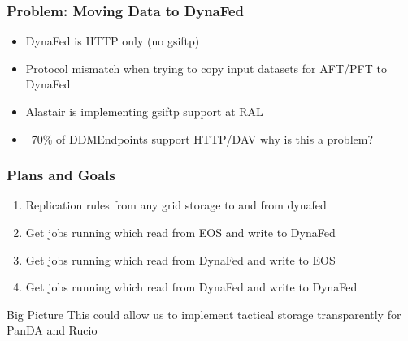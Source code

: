 \documentclass{beamer}
\begin{document}
\begin{frame}
  \frametitle{Problem: Moving Data to DynaFed}
  \begin{itemize}
    \item DynaFed is HTTP only (no gsiftp)
    \item Protocol mismatch when trying to copy input datasets for AFT/PFT to DynaFed
    \item Alastair is implementing gsiftp support at RAL
    \item ~70\% of DDMEndpoints support HTTP/DAV why is this a problem?
  \end{itemize}
\end{frame}

\begin{frame}
  \frametitle{Plans and Goals}
  \begin{enumerate}
    \item Replication rules from any grid storage to and from dynafed
    \item Get jobs running which read from EOS and write to DynaFed
    \item Get jobs running which read from DynaFed and write to EOS
    \item Get jobs running which read from DynaFed and write to DynaFed
  \end{enumerate}
  \begin{block}{Big Picture}
    This could allow us to implement tactical storage transparently for PanDA and Rucio
  \end{block}
\end{frame}
\end{document}
